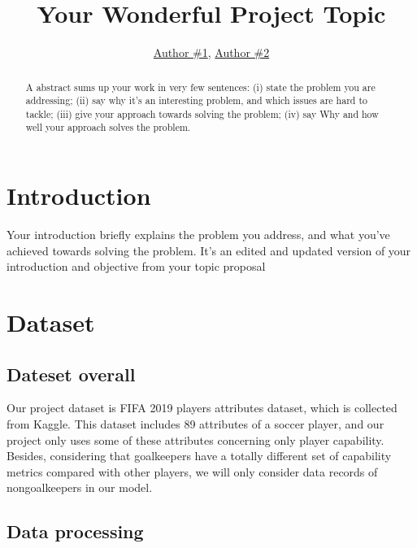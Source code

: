 \documentclass{article}
\title{Your Wonderful Project Topic}
\author{\href{mailto:author1@nyu.edu}{Author \#1}, \href{mailto:author2@nyu.edu}{Author \#2}}
\date{\vspace{-5ex}} %
\begin{document}
\maketitle
\thispagestyle{firstpage}


\begin{abstract}
    A abstract sums up your work in very few sentences:
    (i) state the problem you are addressing;
    (ii) say why it’s an interesting problem, and which issues are hard to tackle; 
    (iii) give your approach towards solving the problem; 
    (iv) say Why and how well your approach solves the problem.
\end{abstract}


\section*{Introduction}

Your introduction briefly explains the problem you address, and what you’ve achieved towards solving the problem. It’s an edited and updated version of your introduction and objective from your topic proposal



\section*{Dataset}

\subsection{Dateset overall}

Our project dataset is FIFA 2019 players attributes dataset, which is collected
from Kaggle. This dataset includes 89 attributes of a soccer player, and our
project only uses some of these attributes concerning only player capability.
Besides, considering that goalkeepers have a totally different set of capability
metrics compared with other players, we will only consider data records of nongoalkeepers in our model.

\subsection{Data processing}
\end{document}
